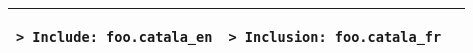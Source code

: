 \documentclass[a3paper,landscape]{article}
\begin{document}
\begin{multicols*}{2}
\begin{center}
\begin{tabular}{p{}p{}p{}}
\begin{verbatim}
> Include: foo.catala_en
\end{verbatim}
\vspace*{-1.75em}
&
\vspace*{-1.75em}
\begin{verbatim}
> Inclusion: foo.catala_fr
\end{verbatim}
\vspace*{-1.75em}
\\
\bottomrule
\end{tabular}
\end{center}
\newcommand*\FancyVerbStartString{```catala}
\newcommand*\FancyVerbStopString{```}















\end{multicols*}
\end{document}
